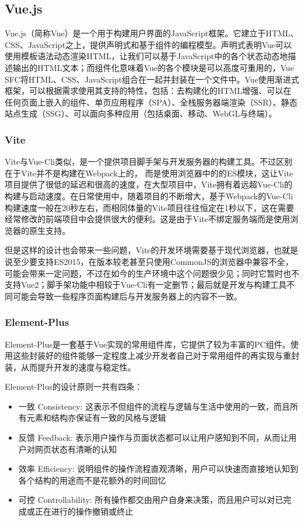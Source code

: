 \subsection{Vue.js}

Vue.js（简称Vue）是一个用于构建用户界面的JavaScript框架。它建立于HTML、CSS、JavaScript之上，提供声明式和基于组件的编程模型。声明式表明Vue可以使用模板语法动态渲染HTML，让我们可以基于JavaScript中的各个状态动态地描述输出的HTML文本；而组件化意味着Vue的各个模块是可以高度可重用的，Vue SFC将HTML、CSS、JavaScript组合在一起并封装在一个文件中。Vue使用渐进式框架，可以根据需求使用其支持的特性，包括：去构建化的HTML增强、可以在任何页面上嵌入的组件、单页应用程序（SPA）、全栈服务器端渲染（SSR）、静态站点生成（SSG）、可以面向多种应用（包括桌面、移动、WebGL与终端）。

\subsubsection{Vite}

Vite与Vue-Cli类似，是一个提供项目脚手架与开发服务器的构建工具。不过区别在于Vite并不是构建在Webpack上的，
而是使用浏览器中的的ES模块，这让Vite项目提供了很低的延迟和很高的速度，在大型项目中，Vite拥有着远超Vue-Cli的构建与启动速度。在日常使用中，随着项目的不断增大，基于Webpack的Vue-Cli构建速度一般在20秒左右，而相同体量的Vite项目往往恒定在1秒以下，这在需要经常修改的前端项目中会提供很大的便利。这是由于Vite不绑定服务端而是使用浏览器的原生支持。

但是这样的设计也会带来一些问题，Vite的开发环境需要基于现代浏览器，也就是说至少要支持ES2015，在版本较老甚至只使用CommonJS的浏览器中兼容不全，可能会带来一定问题，不过在如今的生产环境中这个问题很少见；同时它暂时也不支持Vue2；脚手架功能中相较于Vue-Cli有一定删节；最后就是开发与构建工具不同可能会导致一些程序页面构建后与开发服务器上的内容不一致。

\subsubsection{Element-Plus}

Element-Plus是一套基于Vue实现的常用组件库，它提供了较为丰富的PC组件。使用这些封装好的组件能够一定程度上减少开发者自己对于常用组件的再实现与重封装，从而提升开发的速度与稳定性。

Element-Plus的设计原则一共有四条：

\begin{itemize}
    \item{一致 Consistency}: 这表示不但组件的流程与逻辑与生活中使用的一致，而且所有元素和结构亦保证有一致的风格与逻辑
    \item{反馈 Feedback}: 表示用户操作与页面状态都可以让用户感知到不同，从而让用户对网页状态有清晰的认知
    \item{效率 Efficiency}: 说明组件的操作流程直观清晰，用户可以快速而直接地认知到各个结构的用途而不是花额外的时间回忆
    \item{可控 Controllability}: 所有操作都交由用户自身来决策，而且用户可以对已完成或正在进行的操作撤销或终止
\end{itemize}

